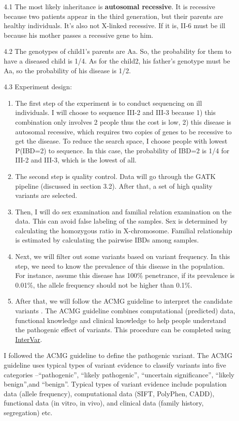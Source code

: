 \documentclass{article}
\begin{document}
\begin{itemize}
    \item[4.1] The most likely inheritance is \textbf{autosomal recessive}. It is recessive because two patients appear in the third generation, but their parents are healthy individuals. It's also not X-linked recessive. If it is, II-6 must be ill because his mother passes a recessive gene to him.
    \item[4.2] The genotypes of child1's parents are Aa. So, the probability for them to have a diseased child is 1/4. As for the child2, his father's genotype must be Aa, so the probability of his disease is 1/2. 
    \item[4.3] Experiment design:
    \begin{enumerate}
        \item The first step of the experiment is to conduct sequencing on ill individuals. I will choose to sequence III-2 and III-3 because 1) this combination only involves 2 people thus the cost is low, 2) this disease is autosomal recessive, which requires two copies of genes to be recessive to get the disease. To reduce the search space, I choose people with lowest P(IBD=2) to sequence. In this case, the probability of IBD=2 is 1/4 for III-2 and III-3, which is the lowest of all.
        \item The second step is quality control. Data will go through the GATK pipeline (discussed in section 3.2). After that, a set of high quality variants are selected.
        \item Then, I will do sex examination and familial relation examination on the data. This can avoid false labeling of the samples. Sex is determined by calculating the homozygous ratio in X-chromosome. Familial relationship is estimated by calculating the pairwise IBDs among samples. 
        \item Next, we will filter out some variants based on variant frequency. In this step, we need to know the prevalence of this disease in the population. For instance, assume this disease has 100\% penetrance, if its prevalence is 0.01\%, the allele frequency should not be higher than 0.1\%.
        \item After that, we will follow the ACMG guideline to interpret the candidate variants \cite{ACMG}. The ACMG guideline combines computational (predicted) data, functional knowledge and clinical knowledge to help people understand the pathogenic effect of variants. This procedure can be completed using \href{https://github.com/WGLab/InterVar}{InterVar}.
    \end{enumerate}
    I followed the ACMG guideline to define the pathogenic variant. 
    The ACMG guideline uses typical types of variant evidence to classify variants into five categories --``pathogenic'', ``likely pathogenic'', ``uncertain significance'', ``likely benign'',and ``benign''. Typical types of variant evidence include population data (allele frequency), computational data (SIFT, PolyPhen, CADD), functional data (in vitro, in vivo), and clinical data (family history, segregation) etc. 


\end{itemize}
\end{document}

